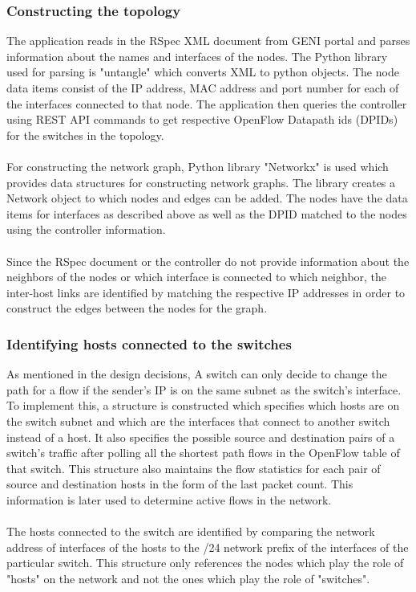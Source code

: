 \documentclass[paper=a4, fontsize=11pt]{scrartcl}	%
\numberwithin{equation}{section}		%
\numberwithin{figure}{section}			%
\numberwithin{table}{section}				%
\begin{document}
\subsubsection{Constructing the topology}
The application reads in the RSpec XML document from GENI portal and parses information about the names and interfaces of the nodes. The Python library used for parsing is "untangle" which converts XML to python objects. The node data items consist of the IP address, MAC address and port number for each of the interfaces connected to that node. The application then queries the controller using REST API commands to get respective OpenFlow Datapath ids (DPIDs) for the switches in the topology.
\\
\\
For constructing the network graph, Python library "Networkx" is used which provides data structures for constructing network graphs. The library creates a Network object to which nodes and edges can be added. The nodes have the data items for interfaces as described above as well as the DPID matched to the nodes using the controller information. 
\\
\\
Since the RSpec document or the controller do not provide information about the neighbors of the nodes or which interface is connected to which neighbor, the inter-host links are identified by matching the respective IP addresses in order to construct the edges between the nodes for the graph.

\subsubsection{Identifying hosts connected to the switches}
As mentioned in the design decisions, A switch can only decide to change the path for a flow if the sender's IP is on the same subnet as the switch's interface. To implement this, a structure is constructed which specifies which hosts are on the switch subnet and which are the interfaces that connect to another switch instead of a host. It also specifies the possible source and destination pairs of a switch's traffic after polling all the shortest path flows in the OpenFlow table of that switch. This structure also maintains the flow statistics for each pair of source and destination hosts in the form of the last packet count. This information is later used to determine active flows in the network.
\\
\\
The hosts connected to the switch are identified by comparing the network address of interfaces of the hosts to the /24 network prefix of the interfaces of the particular switch. This structure only references the nodes which play the role of "hosts" on the network and not the ones which play the role of "switches".
\end{document}
